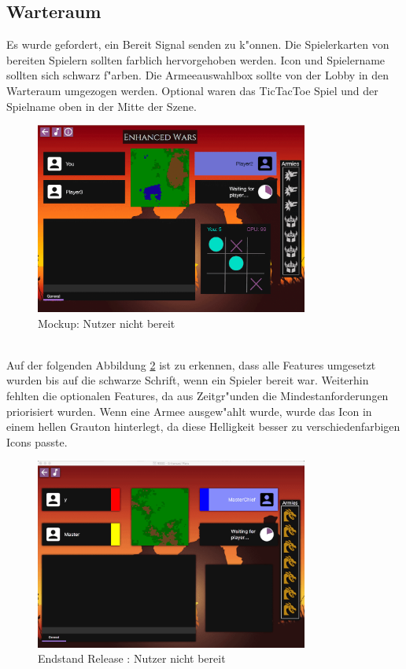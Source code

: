 \documentclass[12pt, titlepage]{scrartcl}
\newcommand{\RN}[1]{%
	\textup{\uppercase\expandafter{\romannumeral#1}}%
}
\begin{document}
		\subsection{Warteraum}
			Es wurde gefordert, ein Bereit Signal senden zu k"onnen. Die Spielerkarten von bereiten Spielern sollten farblich hervorgehoben werden. Icon und Spielername sollten sich schwarz f"arben. Die Armeeauswahlbox sollte von der Lobby in den Warteraum umgezogen werden. Optional waren das TicTacToe Spiel und der Spielname oben in der Mitte der Szene.
			\begin{figure}[H] 
				\centering
				\includegraphics[width=0.8\textwidth]{images/mockups/NotReady.png}
				\caption{Mockup: Nutzer nicht bereit}
				\label{Not_Ready_2}
			\end{figure}
			\ \\ Auf der folgenden Abbildung \ref{End_Not_Ready} ist zu erkennen, dass alle Features umgesetzt wurden bis auf die schwarze Schrift, wenn ein Spieler bereit war. Weiterhin fehlten die optionalen Features, da aus Zeitgr"unden die Mindestanforderungen priorisiert wurden. Wenn eine Armee ausgew"ahlt wurde, wurde das Icon in einem hellen Grauton hinterlegt, da diese Helligkeit besser zu verschiedenfarbigen Icons passte.
			\begin{figure}[H] 
				\centering
				\includegraphics[width=0.8\textwidth]{images/endOfRelease/NotReady.png}
				\caption{Endstand Release \RN{3}: Nutzer nicht bereit}
				\label{End_Not_Ready}
			\end{figure}
\end{document}
